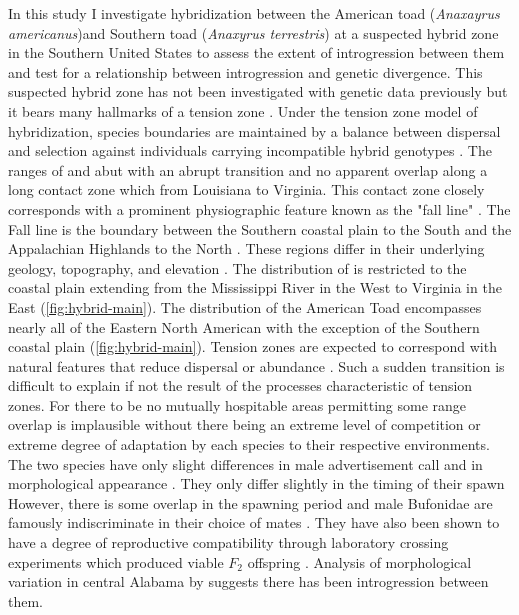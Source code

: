 In this study I investigate hybridization between the American toad 
(\textit{Anaxayrus americanus})and Southern toad (\textit{Anaxyrus terrestris}) 
at a suspected hybrid zone in the Southern United States to assess the extent of 
introgression between them and test for a relationship between introgression and 
genetic divergence. 
This suspected hybrid zone has not been investigated with genetic data previously 
but it bears many hallmarks of a tension zone \parencite{barton1985}. 
Under the tension zone model of hybridization, species boundaries are maintained
by a balance between dispersal and selection against individuals carrying incompatible 
hybrid genotypes \parencite{barton1985}. 
The ranges of \amer and \terr abut with an abrupt transition and no apparent overlap
along a long contact zone which from Louisiana to Virginia. 
This contact zone closely corresponds with a prominent physiographic feature known 
as the "fall line" \parencite{powell2016,mount1975}. 
The Fall line is the boundary between the Southern coastal plain to the South and 
the Appalachian Highlands to the North \parencite{shankman2007}.
These regions differ in their underlying geology, topography, and elevation \parencite{shankman2007}.
The distribution of \terr is restricted to the coastal plain extending from   
the Mississippi River in the West to Virginia in the East (\cref{fig:hybrid-main}).
The distribution of the American Toad encompasses nearly all of the Eastern North 
American with the exception of the Southern coastal plain (\cref{fig:hybrid-main}).
Tension zones are expected to correspond with natural features that reduce
dispersal or abundance \parencite{barton1979}.
Such a sudden transition is difficult to explain if not the result of 
the processes characteristic of tension zones. 
For there to be no mutually hospitable areas permitting some range overlap is 
implausible without there being an extreme level of competition or extreme degree 
of adaptation by each species to their respective environments.
The two species have only slight differences in male advertisement call and in 
morphological appearance \parencite{cocroft1995,weatherby1982}. 
They only differ slightly in the timing of their spawn \parencite{mount1975} 
However, there is some overlap in the spawning period and male Bufonidae 
are famously indiscriminate in their choice of mates \parencite{dordevic2014,weatherby1982}.
They have also been shown to have a degree of reproductive compatibility through 
laboratory crossing experiments which produced viable $F_2$ offspring \parencite{blair1963}. 
Analysis of morphological variation in central Alabama by \cite{weatherby1982} 
suggests there has been introgression between them. 

